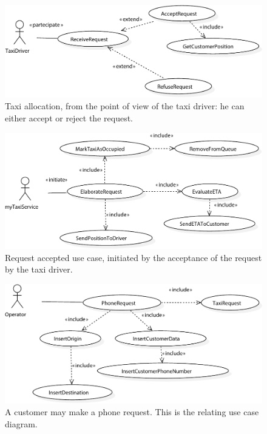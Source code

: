 \begin{figure}%
	\includegraphics[width=\textwidth]{img/U_DriverRequestEvaluation.pdf}%
	\caption{Taxi allocation, from the point of view of the taxi driver: he can either accept or reject the request.}%
\end{figure}


\begin{figure}
	\includegraphics[width=\textwidth]{img/U_RequestAccepted}%
	\caption{Request accepted use case, initiated by the acceptance of the request by the taxi driver.}%
\end{figure}	


\begin{figure}%
	\includegraphics[width=\textwidth]{img/U_PhoneRequest}%
	\caption{A customer may make a phone request. This is the relating use case diagram.}%
\end{figure}	


